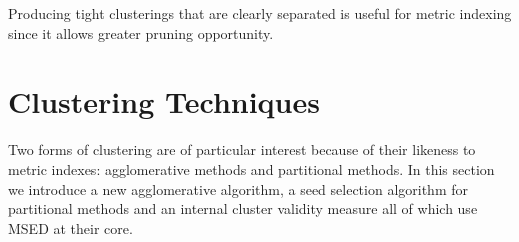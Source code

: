Producing tight clusterings that are clearly separated is useful for metric indexing since it allows greater pruning opportunity.
%
\section{Clustering Techniques}
Two forms of clustering are of particular interest because of their likeness to metric indexes: agglomerative methods and partitional methods.  In this section we introduce a new agglomerative algorithm, a seed selection algorithm for partitional methods and an internal cluster validity measure all of which use MSED at their core.
